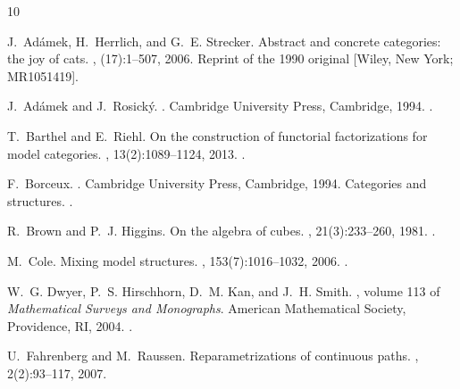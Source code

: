 \documentclass[a4paper,12pt]{amsart}
\theoremstyle{definition}
\begin{document}
\begin{thebibliography}{10}
	
	J.~Ad{\'a}mek, H.~Herrlich, and G.~E. Strecker.
	\newblock Abstract and concrete categories: the joy of cats.
	, (17):1--507, 2006.
	\newblock Reprint of the 1990 original [Wiley, New York; MR1051419].
	
	J.~Ad{\'a}mek and J.~Rosick{\'y}.
	.
	\newblock Cambridge University Press, Cambridge, 1994.
	\newblock \href {https://doi.org/10.1017/cbo9780511600579.004}
	{}.
	
	T.~Barthel and E.~Riehl.
	\newblock On the construction of functorial factorizations for model
	categories.
	, 13(2):1089--1124, 2013.
	\newblock \href {https://doi.org/10.2140/agt.2013.13.1089}
	{}.
	
	F.~Borceux.
	.
	\newblock Cambridge University Press, Cambridge, 1994.
	\newblock Categories and structures.
	\newblock \href {https://doi.org/10.1017/cbo9780511525865}
	{}.
	
	R.~Brown and P.~J. Higgins.
	\newblock On the algebra of cubes.
	, 21(3):233--260, 1981.
	\newblock \href {https://doi.org/10.1016/0022-4049(81)90018-9}
	{}.
	
	M.~Cole.
	\newblock Mixing model structures.
	, 153(7):1016--1032, 2006.
	\newblock \href {https://doi.org/10.1016/j.topol.2005.02.004}
	{}.
	
	W.~G. Dwyer, P.~S. Hirschhorn, D.~M. Kan, and J.~H. Smith.
	, volume 113 of {\em Mathematical Surveys and Monographs}.
	\newblock American Mathematical Society, Providence, RI, 2004.
	\newblock \href {https://doi.org/10.1090/surv/113}
	{}.
	
	U.~Fahrenberg and M.~Raussen.
	\newblock Reparametrizations of continuous paths.
	, 2(2):93--117, 2007.
	

\end{thebibliography}
\end{document}
